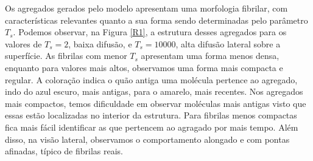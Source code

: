 \documentclass{article}
\begin{document}
    Os agregados gerados pelo modelo apresentam uma morfologia fibrilar, com características relevantes quanto a sua forma 
    sendo determinadas pelo parâmetro \(T_{s}\). Podemos observar, na Figura \ref{R1}, a estrutura desses agregados 
    para os valores de \(T_{s} = 2\), baixa difusão, e \(T_{s} = 10000\), alta difusão lateral sobre a superfície. As 
    fibrilas com menor \(T_{s}\) apresentam uma forma menos densa, enquanto para valores mais altos, observamos uma 
    forma mais compacta e regular. A coloração indica o quão antiga uma molécula pertence ao agregado, indo do azul 
    escuro, mais antigas, para o amarelo, mais recentes. Nos agregados mais compactos, temos dificuldade em observar 
    moléculas mais antigas visto que essas estão localizadas no interior da estrutura. Para fibrilas menos compactas fica 
    mais fácil identificar as que pertencem ao agragado por mais tempo. Além disso, na visão lateral, observamos o 
    comportamento alongado e com pontas afinadas, típico de fibrilas reais. 
\end{document}
